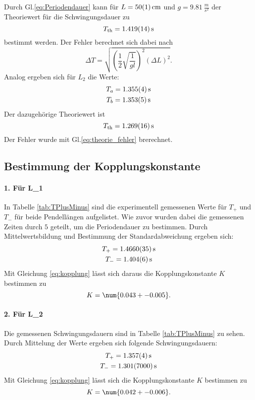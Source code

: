 \noindent Durch Gl.\eqref{eq:Periodendauer} kann für $L = \SI{50 +- 1}{cm} $ und $g = \SI{9.81}{\frac{m}{s^2}} $ der Theoriewert für die Schwingungsdauer zu
\begin{equation}
    T_\text{th} = \SI{1.419 +- 0.014}{s}
\end{equation}
bestimmt werden.
Der Fehler berechnet sich dabei nach
\begin{equation}
    \label{eq:theorie_fehler}
    \Delta T = \sqrt{ \left( \frac{1}{2} \sqrt{ \frac{1}{g l} } \right)^2 ( \Delta L)  ^2 } .
\end{equation}
Analog ergeben sich für $L_2$ die Werte:
\begin{gather}
    T_a = \SI{1.355 +- 0.004}{s} \\
    T_b = \SI{1.353 +- 0.005}{s}
\end{gather}
Der dazugehörige Theoriewert ist 
\begin{equation}
    T_\text{th} = \SI{1.269 +- 0.016}{s}
\end{equation}
Der Fehler wurde mit Gl.\eqref{eq:theorie_fehler} brerechnet.

\subsection{Bestimmung der Kopplungskonstante}
\label{sec:kopplung}

\paragraph{1. Für L_1}
In Tabelle \ref{tab:TPlusMinus} sind die experimentell gemessenen Werte für $T_+$ und $T_-$ für beide Pendellängen aufgelistet.
Wie zuvor wurden dabei die gemessenen Zeiten durch $5$ geteilt, um die Periodendauer zu bestimmen. Durch Mittelwertsbildung und Bestimmung der
Standardabweichung ergeben sich:
\begin{gather}
    T_+ = \SI{1.4660 +- 0.0035}{s} \\
    T_- = \SI{1.404 +- 0.006}{s}
\end{gather}
Mit Gleichung \eqref{eq:kopplung} lässt sich daraus die Kopplungskonstante $K$ bestimmen zu 
\begin{equation}
    K = \num{0.043 +- 0.005} .
\end{equation}

\paragraph{2. Für L_2}
Die gemessenen Schwingungsdauern sind in Tabelle \ref{tab:TPlusMinus} zu sehen. Durch Mittelung der Werte ergeben sich folgende Schwingungsdauern:
\begin{gather}
    T_+ = \SI{1.357 +- 0.004}{s} \\
    T_- = \SI{1.301 +- 007}{s}
\end{gather}
Mit Gleichung \eqref{eq:kopplung} lässt sich die Kopplungskonstante $K$ bestimmen zu
\begin{equation}
    K = \num{0.042 +- 0.006} .
\end{equation}


